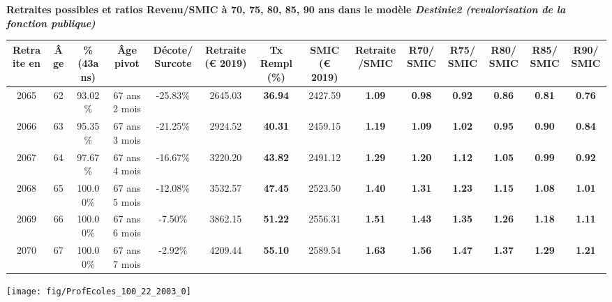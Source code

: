  \vspace{0.1cm} 
{\bf \noindent Retraites possibles et ratios Revenu/SMIC à 70, 75, 80, 85, 90 ans dans le modèle \emph{Destinie2 (revalorisation de la fonction publique)}}  
 
\begin{adjustbox}{max width=\textwidth} 
\begin{tabular}[htb]{|c|c||c|c|c||c|c||c|c||c|c|c|c|c|} 
\hline 
 Retraite en &  Âge &  \%(43ans) &  Âge pivot &  Décote/Surcote &  Retraite (\euro{} 2019) &  Tx Rempl(\%) &  SMIC (\euro{} 2019) &  Retraite/SMIC &  R70/SMIC &  R75/SMIC &  R80/SMIC &  R85/SMIC &  R90/SMIC \\ 
\hline \hline 
 2065 &  62 &  93.02\% &  67 ans 2 mois &  -25.83\% &  2645.03 &  {\bf 36.94} &  2427.59 &  {\bf 1.09} &  {\bf {\color{red} 0.98}} &  {\bf {\color{red} 0.92}} &  {\bf {\color{red} 0.86}} &  {\bf {\color{red} 0.81}} &  {\bf {\color{red} 0.76}} \\ 
\hline 
 2066 &  63 &  95.35\% &  67 ans 3 mois &  -21.25\% &  2924.52 &  {\bf 40.31} &  2459.15 &  {\bf 1.19} &  {\bf 1.09} &  {\bf 1.02} &  {\bf {\color{red} 0.95}} &  {\bf {\color{red} 0.90}} &  {\bf {\color{red} 0.84}} \\ 
\hline 
 2067 &  64 &  97.67\% &  67 ans 4 mois &  -16.67\% &  3220.20 &  {\bf 43.82} &  2491.12 &  {\bf 1.29} &  {\bf 1.20} &  {\bf 1.12} &  {\bf 1.05} &  {\bf {\color{red} 0.99}} &  {\bf {\color{red} 0.92}} \\ 
\hline 
 2068 &  65 &  100.00\% &  67 ans 5 mois &  -12.08\% &  3532.57 &  {\bf 47.45} &  2523.50 &  {\bf 1.40} &  {\bf 1.31} &  {\bf 1.23} &  {\bf 1.15} &  {\bf 1.08} &  {\bf 1.01} \\ 
\hline 
 2069 &  66 &  100.00\% &  67 ans 6 mois &  -7.50\% &  3862.15 &  {\bf 51.22} &  2556.31 &  {\bf 1.51} &  {\bf 1.43} &  {\bf 1.35} &  {\bf 1.26} &  {\bf 1.18} &  {\bf 1.11} \\ 
\hline 
 2070 &  67 &  100.00\% &  67 ans 7 mois &  -2.92\% &  4209.44 &  {\bf 55.10} &  2589.54 &  {\bf 1.63} &  {\bf 1.56} &  {\bf 1.47} &  {\bf 1.37} &  {\bf 1.29} &  {\bf 1.21} \\ 
\hline 
\hline 
\end{tabular} 
\end{adjustbox} 
 
 \vspace{0.1cm} 

 {\hspace{-2.2cm}\texttt{[image: fig/ProfEcoles\_100\_22\_2003\_0]}} 

